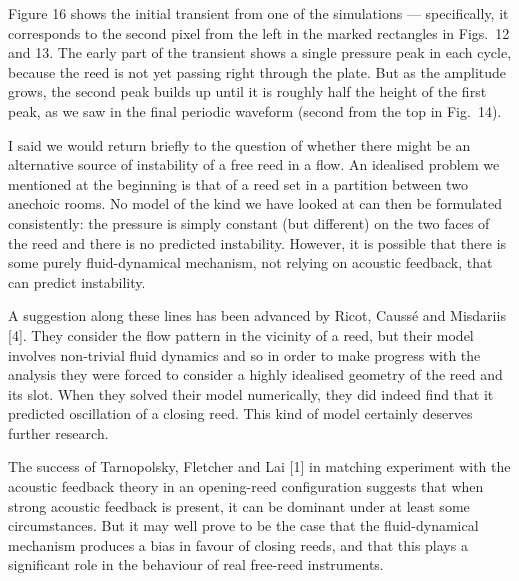 
  Figure 16 shows the initial transient from one of the simulations — 
  specifically, it corresponds to the second pixel from the left in the marked 
  rectangles in Figs.\ 12 and 13. The early part of the transient shows a 
  single pressure peak in each cycle, because the reed is not yet passing right 
  through the plate. But as the amplitude grows, the second peak builds up 
  until it is roughly half the height of the first peak, as we saw in the final 
  periodic waveform (second from the top in Fig.\ 14). 


  I said we would return briefly to the question of whether there might be an 
  alternative source of instability of a free reed in a flow. An idealised 
  problem we mentioned at the beginning is that of a reed set in a partition 
  between two anechoic rooms. No model of the kind we have looked at can then 
  be formulated consistently: the pressure is simply constant (but different) 
  on the two faces of the reed and there is no predicted instability. However, 
  it is possible that there is some purely fluid-dynamical mechanism, not 
  relying on acoustic feedback, that can predict instability. 

  A suggestion along these lines has been advanced by Ricot, Caussé and 
  Misdariis [4]. They consider the flow pattern in the vicinity of a reed, but 
  their model involves non-trivial fluid dynamics and so in order to make 
  progress with the analysis they were forced to consider a highly idealised 
  geometry of the reed and its slot. When they solved their model numerically, 
  they did indeed find that it predicted oscillation of a closing reed. This 
  kind of model certainly deserves further research. 

  The success of Tarnopolsky, Fletcher and Lai [1] in matching experiment with 
  the acoustic feedback theory in an opening-reed configuration suggests that 
  when strong acoustic feedback is present, it can be dominant under at least 
  some circumstances. But it may well prove to be the case that the 
  fluid-dynamical mechanism produces a bias in favour of closing reeds, and 
  that this plays a significant role in the behaviour of real free-reed 
  instruments. 


